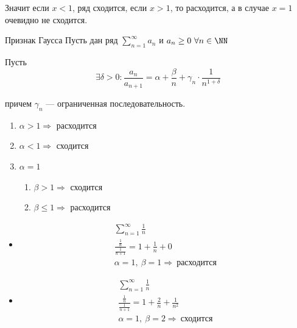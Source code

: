 Значит если \( x < 1 \), ряд сходится, если \( x > 1 \), то расходится, а в случае \( x = 1 \) очевидно не сходится.

\begin{thrm}{Признак Гаусса}{}
    Пусть дан ряд \( \sum\limits_{n = 1}^{\infty} a_n \) и \( a_n \geq 0 \ \forall n \in \NN \)

    Пусть
    \[
        \exists \delta > 0 : \frac{a_n}{a_{n + 1}} = \alpha + \frac{\beta}{n} + \gamma_n \cdot \frac{1}{n^{1 + \delta}}
    \]

    причем \( \gamma_n \) --- ограниченная последовательность.

    \begin{enumerate}
        \item
            \( \alpha > 1 \Rightarrow \) расходится
        \item
            \( \alpha < 1 \Rightarrow \) сходится
        \item
            \( \alpha = 1 \)

            \begin{enumerate}
                \item
                    \( \beta > 1 \Rightarrow \) сходится
                \item
                    \( \beta \leq 1 \Rightarrow \) расходится
            \end{enumerate}
    \end{enumerate}
\end{thrm}

\begin{example}{}{}
    \begin{itemize}
        \item
            \begin{gather*}
                \sum\limits_{n = 1}^{\infty} \frac{1}{n}
                \\
                \frac{\frac{1}{n}}{\frac{1}{n + 1}} = 1 + \frac{1}{n} + 0
                \\
                \alpha = 1, \ \beta = 1 \Rightarrow \ \text{расходится}
            \end{gather*}
        \item
            \begin{gather*}
                \sum\limits_{n = 1}^{\infty} \frac{1}{n}
                \\
                \frac{\frac{1}{n}}{\frac{1}{n + 1}} = 1 + \frac{2}{n} + \frac{1}{n^2}
                \\
                \alpha = 1, \ \beta = 2 \Rightarrow \ \text{сходится}
            \end{gather*}
    \end{itemize}
\end{example}


